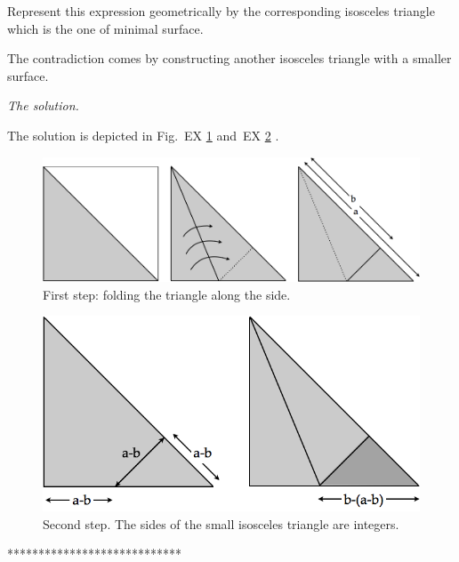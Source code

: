 {Represent this expression geometrically by the corresponding isosceles triangle
which is the one of minimal surface. 

The contradiction comes by constructing another isosceles triangle with a smaller surface.
\medskip

\noindent \textit{The solution.}

The solution is depicted in Fig.~EX \ref{Fig:sqrtbisInit} and~EX \ref{Fig:sqrtbisFin} . 
\begin{figure}
\begin{center}
        \includegraphics[scale=0.3]{FiguresArithmetic/sqrtbisInit}
        \caption{First step: folding the triangle along the side.}
        \label{Fig:sqrtbisInit}
\end{center}
\end{figure}
\begin{figure}
\begin{center}
        \includegraphics[scale=0.3]{FiguresArithmetic/sqrtbisFin}
        \caption{Second step. The sides of the small isosceles triangle are integers.}
        \label{Fig:sqrtbisFin}
\end{center}
\end{figure}
****************************}



